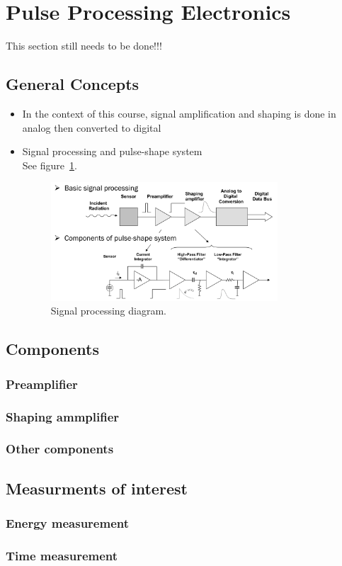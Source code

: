 \section{Pulse Processing Electronics}
{\color{red} This section still needs to be done!!!}
\subsection{General Concepts}
\begin{itemize}
    \item In the context of this course, signal amplification and shaping is done in analog then converted to digital  
    \item Signal processing and pulse-shape system\\
    See figure~\ref{fig:signal_processing}.
    \begin{figure}[ht]
        \centering
        \includegraphics[width=0.8\textwidth]{images/signal_processing_diagram.png}
        \caption{Signal processing diagram.}
        \label{fig:signal_processing}
    \end{figure}
\end{itemize}
\subsection{Components}
\subsubsection{Preamplifier}

\subsubsection{Shaping ammplifier}
\subsubsection{Other components}
\subsection{Measurments of interest}
\subsubsection{Energy measurement}
\subsubsection{Time measurement}